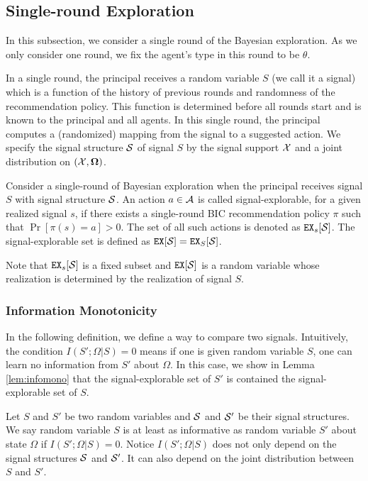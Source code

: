\subsection{Single-round Exploration}
\label{sec:public_single}

In this subsection, we consider a single round of the Bayesian exploration. As we only consider one round, we fix the agent's type in this round to be $\theta$. 

In a single round, the principal receives a random variable $S$ (we call it a signal) which is a function of the history of previous rounds and randomness of the recommendation policy. This function is determined before all rounds start and is known to the principal and all agents. In this single round, the principal computes a (randomized) mapping from the signal to a suggested action. We specify the signal structure $\S$ of signal $S$ by the signal support $\X$ and a joint distribution on $(\X, \varOmega)$.  


\begin{definition}
Consider a single-round of Bayesian exploration when the principal receives signal $S$ with signal structure $\S$. An action $a \in \A$ is called signal-explorable, for a given realized signal $s$, if there exists a single-round BIC recommendation policy $\pi$ such that $\Pr[\pi(s) = a] > 0$. The set of all such actions is denoted as $\EX_s[\S]$. The signal-explorable set is defined as $\EX[\S] = \EX_S[\S]$.
\end{definition}

Note that $\EX_s[\S]$ is a fixed subset and $\EX[\S]$ is a random variable whose realization is determined by the realization of signal $S$.

\subsubsection{Information Monotonicity}
In the following definition, we define a way to compare two signals. Intuitively, the condition $I(S';\Omega|S)= 0$  means if one is given random variable $S$, one can learn no information from $S'$ about $\Omega$. In this case, we show in Lemma \ref{lem:infomono} that the signal-explorable set of $S'$ is contained the signal-explorable set of $S$.
\begin{definition}
Let $S$ and $S'$ be two random variables and $\S$ and $\S'$ be their signal structures. We say random variable $S$ is at least as informative as random variable $S'$ about state $\Omega$ if $I(S' ; \Omega|S) = 0$. Notice $I(S';\Omega|S)$ does not only depend on the signal structures $\S$ and $\S'$. It can also depend on the joint distribution between $S$ and $S'$.
\end{definition}

